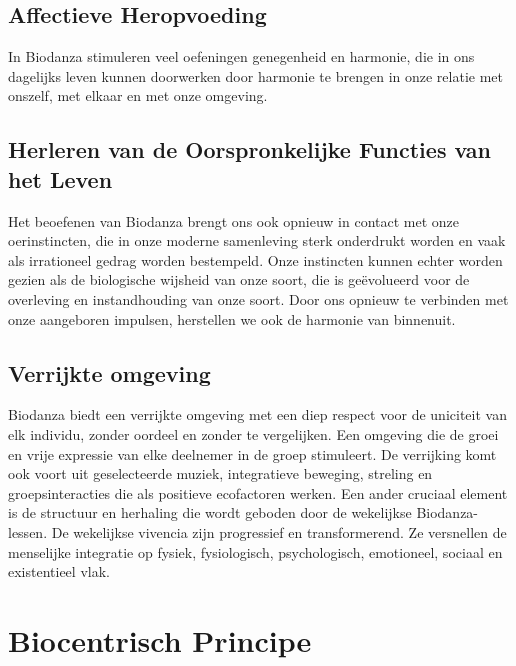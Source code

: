 \documentclass[
  11pt,
]{book}
\begin{document}
\hypertarget{affectieve-heropvoeding}{%
\subsection{Affectieve Heropvoeding}\label{affectieve-heropvoeding}}

In Biodanza stimuleren veel oefeningen genegenheid en harmonie, die in ons dagelijks leven kunnen doorwerken door harmonie te brengen in onze relatie met onszelf, met elkaar en met onze omgeving.

\hypertarget{herleren-van-de-oorspronkelijke-functies-van-het-leven}{%
\subsection{Herleren van de Oorspronkelijke Functies van het Leven}\label{herleren-van-de-oorspronkelijke-functies-van-het-leven}}

Het beoefenen van Biodanza brengt ons ook opnieuw in contact met onze oerinstincten, die in onze moderne samenleving sterk onderdrukt worden en vaak als irrationeel gedrag worden bestempeld. Onze instincten kunnen echter worden gezien als de biologische wijsheid van onze soort, die is geëvolueerd voor de overleving en instandhouding van onze soort. Door ons opnieuw te verbinden met onze aangeboren impulsen, herstellen we ook de harmonie van binnenuit.

\hypertarget{verrijkte-omgeving}{%
\subsection{Verrijkte omgeving}\label{verrijkte-omgeving}}

Biodanza biedt een verrijkte omgeving met een diep respect voor de uniciteit van elk individu, zonder oordeel en zonder te vergelijken. Een omgeving die de groei en vrije expressie van elke deelnemer in de groep stimuleert. De verrijking komt ook voort uit geselecteerde muziek, integratieve beweging, streling en groepsinteracties die als positieve ecofactoren werken. Een ander cruciaal element is de structuur en herhaling die wordt geboden door de wekelijkse Biodanza-lessen. De wekelijkse vivencia zijn progressief en transformerend. Ze versnellen de menselijke integratie op fysiek, fysiologisch, psychologisch, emotioneel, sociaal en existentieel vlak.

\hypertarget{sectionBiocentricPrinciple}{%
\section{Biocentrisch Principe}\label{sectionBiocentricPrinciple}}
\end{document}
